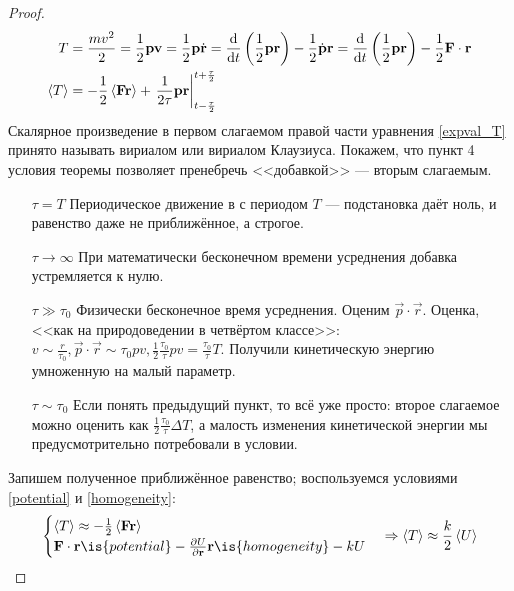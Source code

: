 \documentclass[12pt, a4paper]{article}
\begin{document}
\begin{proof}
\begin{align}
T &= \frac{mv^2}{2} = \frac{1}{2} {\vb{p} \vb{v}} = \frac{1}{2} {\vb{p}  \dot{\vb{r}}} = \dv{t} \left( \frac{1}{2} \vb{p}  \vb{r} \right) - \frac{1}{2} \dot{\vb{p}}  \vb{r} =  \dv{t} \left(\frac{1}{2} \vb{p}  \vb{r} \right) - \frac{1}{2} \vb{F} \cdot \vb{r} \notag\\
\expval{T} &= -\frac{1}{2} \expval{\vb{F} \vb{r}} + \left. \frac{1}{2\tau} \vb{p} \vb{r} \right|_{t-\frac{\tau}{2}}^{t+\frac{\tau}{2}} \label{expval_T}
\end{align}
Скалярное произведение в первом слагаемом правой части уравнения \eqref{expval_T} принято называть вириалом или вириалом Клаузиуса.  Покажем, что пункт 4 условия теоремы позволяет пренебречь  <<добавкой>> --- вторым слагаемым.
\begin{itemize}
\item[$\tau = T$] Периодическое движение в с периодом $T$ --- подстановка даёт ноль, и равенство даже не приближённое, а строгое.
\item[$\tau \rightarrow \infty$] При математически бесконечном времени усреднения добавка устремляется к нулю.
\item[$\tau \gg \tau_0$] Физически бесконечное время усреднения. Оценим $\vec{p} \cdot \vec{r}$. Оценка, <<как на природоведении в четвёртом классе>>: $v \sim \frac{r}{\tau_0}, \vec{p} \cdot \vec{r} \sim \tau_0 p v, \frac{1}{2} \frac{\tau_0}{\tau} pv = \frac{\tau_0}{\tau} T$. Получили кинетическую энергию умноженную на малый параметр.
\item[$\tau \sim \tau_0$] Если понять предыдущий пункт, то всё уже просто: второе слагаемое можно оценить как $\frac{1}{2	}\frac{\tau_0}{\tau} \Delta{T}$, а малость изменения кинетической энергии мы предусмотрительно потребовали в условии.
\end{itemize}
Запишем полученное приближённое равенство; воспользуемся условиями \ref{potential} и \ref{homogeneity}:
\begin{equation*}
\begin{cases}
\expval{T} \approx - \frac{1}{2} \expval{\vb{F} \vb{r}}\\
\vb{F} \cdot \vb{r} \is{potential}  -\pdv{U}{\vb{r}} \vb{r} \is{homogeneity} - kU
\end{cases}
\Rightarrow \expval{T} \approx \frac{k}{2} \expval U
\end{equation*}
\end{proof}
\end{document}
